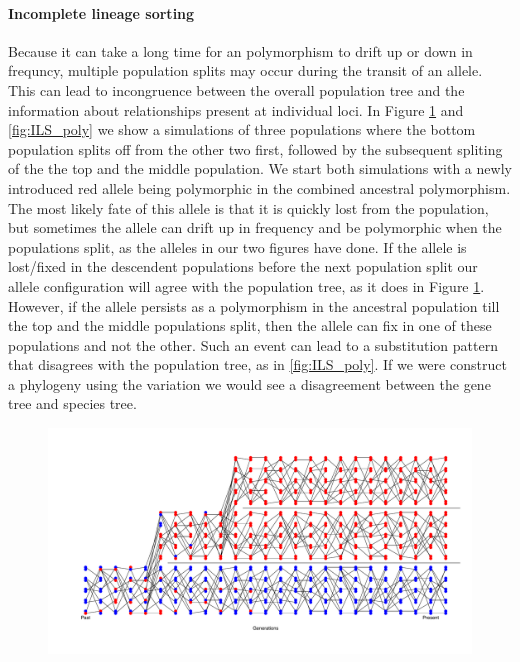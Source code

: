 \paragraph{Incomplete lineage sorting}

Because it can take a long time for an polymorphism to drift up or down in
frequncy, multiple population splits may occur during the transit of
an allele. This can lead to incongruence between the overall
population tree  and the information about relationships present at
individual loci. In Figure \ref{fig:NoILS_poly} and \ref{fig:ILS_poly}
we show a simulations
of three populations where the bottom population splits off from the
other two first, followed by the subsequent spliting of the the top
and the middle population. We start both simulations with a newly
introduced red allele being polymorphic in the combined ancestral
polymorphism. The most likely fate of this allele is that it is
quickly lost from the population, but sometimes the allele can drift
up in frequency and be polymorphic when the populations split, as the
alleles in our two figures have done. If the allele is lost/fixed in
the descendent populations before the next population split our allele
configuration will agree with the population tree, as it does in
Figure  \ref{fig:NoILS_poly}. However, if the allele persists as a
polymorphism in the ancestral population till the top and the middle
populations split, then the allele can fix in one of these populations
and not the other. Such an event can lead to a substitution pattern
that disagrees with the population tree, as in \ref{fig:ILS_poly}.  If
we were construct a phylogeny using the variation we would see a
disagreement between the gene tree and species tree.

\begin{figure}
\begin{center}
\includegraphics[width=\textwidth]{figures/Genetic_drift/ILS/no_ILS.pdf}
\end{center}
\caption{  } \label{fig:NoILS_poly} 
\end{figure}

